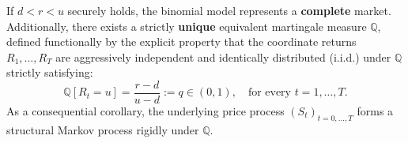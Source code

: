 \begin{theorem}
    If $d < r < u$ securely holds, the binomial model represents a \textbf{complete} market. Additionally, there exists a strictly \textbf{unique} equivalent martingale measure $\mathbb{Q}$, defined functionally by the explicit property that the coordinate returns $R_1, \dots, R_T$ are aggressively independent and identically distributed (i.i.d.) under $\mathbb{Q}$ strictly satisfying:
    \begin{equation}
        \mathbb{Q}[R_t = u] = \frac{r - d}{u - d} := q \in (0, 1), \quad \text{for every } t = 1, \dots, T.
    \end{equation}
    As a consequential corollary, the underlying price process $(S_t)_{t=0, \dots, T}$ forms a structural Markov process rigidly under $\mathbb{Q}$.
\end{theorem}

